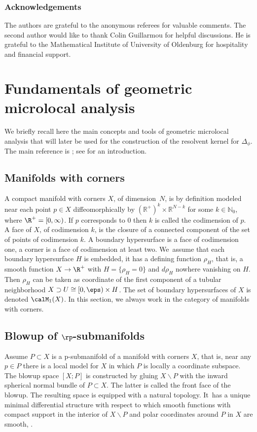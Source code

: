 \subsubsection*{Acknowledgements}
The authors are grateful to the anonymous referees for valuable comments. The second author would like to thank Colin Guillarmou
for helpful discussions. He is grateful to the Mathematical Institute of University of Oldenburg for hospitality and financial support.

\section{Fundamentals of geometric microlocal analysis}\label{sec:fund}
We briefly recall here the main concepts and tools of geometric microlocal analysis that will later be used
for the construction of the resolvent kernel for $\Delta_{\phi}$. The main reference
is \cite{melrose1993atiyah}; see \cite{Gri:BBC} for an introduction.

\subsection{Manifolds with corners}
A compact manifold with corners $X$, of dimension~$N$, is by definition modeled near each point $p\in X$ diffeomorphically by
\hbox{$(\mathbb{R}^+)^{k}\times\mathbb{R}^{N-k}$} for some $k \in \mathbb{N}_0$, where $\R^+=[0,\infty)$.
If $p$ corresponds to $0$ then $k$ is called the codimension of $p$. A face of $X$, of codimension $k$, is the closure of a connected component of the set of points of codimension $k$. A boundary hypersurface is a face of codimension one, a corner is a face of codimension at least two.
We~assume that each boundary hypersurface $H$ is embedded, \ie it has a defining function $\rho_H$, that is, a smooth function $X\to\R^+$ with
$H = \{\rho_H = 0\}$ and $d\rho_H$ nowhere vanishing on $H$. Then $\rho_H$ can be taken as coordinate of
the first component of a tubular neighborhood $X\supset U\cong [0,\eps)\times H$.
The set of boundary hypersurfaces of $X$ is denoted $\calM_1(X)$.
In this section, we
always work in the category of manifolds with corners.

\subsection{Blowup of \texorpdfstring{$\rp$}{p}-submanifolds}
Assume $P \subset X$ is a p-submanifold of a manifold
with corners $X$, that is, near any $p\in P$ there is a local model for $X$ in which $P$ is locally a coordinate subspace. The blowup space $[X;P]$ is constructed by gluing
$X\backslash P$ with the inward spherical normal bundle of $P \subset X$. The latter is called the front face of the blowup.
The resulting space is equipped with a natural topology. It~has a unique minimal
differential structure with respect to which smooth functions with compact support in the
interior of $X\backslash P$ and polar coordinates around $P$ in $X$ are smooth, \cf \cite[\S 4.1]{melrose1993atiyah}.

